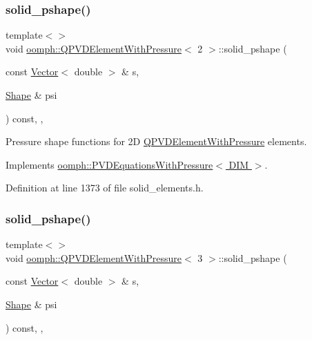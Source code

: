 \subsubsection{\texorpdfstring{solid\+\_\+pshape()}{solid\_pshape()}\hspace{0.1cm}{\footnotesize\ttfamily [2/3]}}
{\footnotesize\ttfamily template$<$$>$ \\
void \hyperlink{classoomph_1_1QPVDElementWithPressure}{oomph\+::\+Q\+P\+V\+D\+Element\+With\+Pressure}$<$ 2 $>$\+::solid\+\_\+pshape (\begin{DoxyParamCaption}\item[{const \hyperlink{classoomph_1_1Vector}{Vector}$<$ double $>$ \&}]{s,  }\item[{\hyperlink{classoomph_1_1Shape}{Shape} \&}]{psi }\end{DoxyParamCaption}) const\hspace{0.3cm}{\ttfamily [inline]}, {\ttfamily [protected]}, {\ttfamily [virtual]}}



Pressure shape functions for 2D \hyperlink{classoomph_1_1QPVDElementWithPressure}{Q\+P\+V\+D\+Element\+With\+Pressure} elements. 



Implements \hyperlink{classoomph_1_1PVDEquationsWithPressure_ad580f7919412f6b574b76f514f56282c}{oomph\+::\+P\+V\+D\+Equations\+With\+Pressure$<$ D\+I\+M $>$}.



Definition at line 1373 of file solid\+\_\+elements.\+h.

\mbox{\label{classoomph_1_1QPVDElementWithPressure_a98385eaf0ad482ac7c2781eb32847054}} 
\subsubsection{\texorpdfstring{solid\+\_\+pshape()}{solid\_pshape()}\hspace{0.1cm}{\footnotesize\ttfamily [3/3]}}
{\footnotesize\ttfamily template$<$$>$ \\
void \hyperlink{classoomph_1_1QPVDElementWithPressure}{oomph\+::\+Q\+P\+V\+D\+Element\+With\+Pressure}$<$ 3 $>$\+::solid\+\_\+pshape (\begin{DoxyParamCaption}\item[{const \hyperlink{classoomph_1_1Vector}{Vector}$<$ double $>$ \&}]{s,  }\item[{\hyperlink{classoomph_1_1Shape}{Shape} \&}]{psi }\end{DoxyParamCaption}) const\hspace{0.3cm}{\ttfamily [inline]}, {\ttfamily [protected]}, {\ttfamily [virtual]}}




